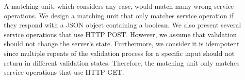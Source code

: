A matching unit, which considers any case, would match many wrong service operations. We design a matching unit that only matches service operation if they respond with a JSON object containing a boolean. We also present several service operations that use HTTP POST. However, we assume that validation should not change the server's state. Furthermore, we consider it is idempotent since multiple repeats of the validation process for a specific input should not return in different validation states. Therefore, the matching unit only matches service operations that use HTTP GET.